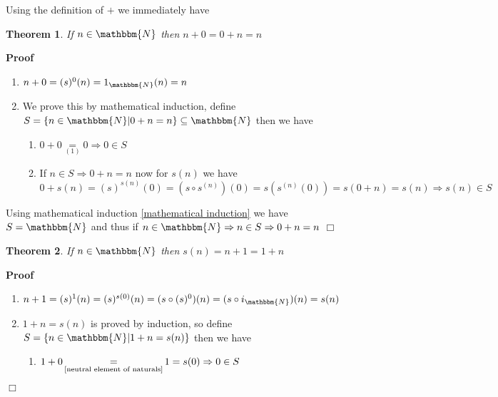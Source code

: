 \documentclass{book}
\newcommand{\equallim}{\mathop{=}\limits}
\newcommand{\nobracket}{}
\newcommand{\upl}{+}
\newenvironment{proof}{\noindent\textbf{Proof\ }}{\hspace*{\fill}$\Box$\medskip}
\newtheorem{theorem}{Theorem}
\begin{document}
{{Using the definition of $+$ we immediately have

\begin{theorem}
  \label{neutral element of naturals}{}If $n \in \mathbbm{N}$ then $n \upl 0 = 0 \upl n = n$
\end{theorem}

\begin{proof}
  
  \begin{enumerate}
    \item $n \upl 0 = (s)^0 (n) = 1_{\mathbbm{N}} (n) = n$
    
    \item We prove this by mathematical induction, define $S = \{ n \in
    \mathbbm{N} | 0 \upl n = n \nobracket \} \subseteq \mathbbm{N}$ then we
    have
    \begin{enumerate}
      \item $0 \upl 0 \equallim_{(1)} 0 \Rightarrow 0 \in S$
      
      \item If $n \in S \Rightarrow 0 \upl n = n$ now for $s (n)$ we have $0
      \upl s (n) = (s)^{s (n)} (0) = (s \circ s^{(n)}) (0) = s (s^{(n)} (0)) =
      s (0 \upl n) = s (n) \Rightarrow s (n) \in S$
    \end{enumerate}
  \end{enumerate}
  Using mathematical induction \ref{mathematical induction} we have $S
  =\mathbbm{N}$ and thus if $n \in \mathbbm{N} \Rightarrow n \in S \Rightarrow
  0 \upl n = n$
\end{proof}

\begin{theorem}
  \label{successor function and addition}If $n \in \mathbbm{N}$ then $s (n) =
  n \upl 1 = 1 \upl n$
\end{theorem}

\begin{proof}
  
  \begin{enumerate}
    \item $n \upl 1 = (s)^1 (n) = (s)^{s (0)} (n) = (s \circ (s)^0) (n) = (s
    \circ i_{\mathbbm{N}}) (n) = s (n)$
    
    \item $1 \upl n = s (n)$ is proved by induction, so define $S = \{ n \in
    \mathbbm{N} | 1 \upl n = s (n) \nobracket \}$ then we have
    \begin{enumerate}
      \item $1 \upl 0 \equallim_{\text{\ref{neutral element of naturals}}} 1 =
      s (0) \Rightarrow 0 \in S$
      

\end{enumerate}
\end{enumerate}
\end{proof}}}
\end{document}
